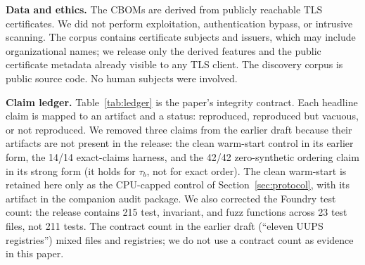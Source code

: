 \documentclass[conference,10pt]{IEEEtran}
\newcommand{\tb}{\tau_b}
\begin{document}
\textbf{Data and ethics.} The CBOMs are derived from publicly reachable TLS certificates. We did
not perform exploitation, authentication bypass, or intrusive scanning. The corpus contains
certificate subjects and issuers, which may include organizational names; we release only the
derived features and the public certificate metadata already visible to any TLS client. The
discovery corpus is public source code. No human subjects were involved.

\textbf{Claim ledger.} Table~\ref{tab:ledger} is the paper's integrity contract. Each headline
claim is mapped to an artifact and a status: reproduced, reproduced but vacuous, or not
reproduced. We removed three claims from the earlier draft because their artifacts are not
present in the release: the clean warm-start control in its earlier form, the 14/14 exact-claims
harness, and the 42/42 zero-synthetic ordering claim in its strong form (it holds for $\tb$, not
for exact order). The clean warm-start is retained here only as the CPU-capped control of
Section~\ref{sec:protocol}, with its artifact in the companion audit package. We also corrected
the Foundry test count: the release contains 215 test, invariant, and fuzz functions across 23
test files, not 211 tests. The contract count in the earlier draft (``eleven UUPS registries'')
mixed files and registries; we do not use a contract count as evidence in this paper.
\end{document}
